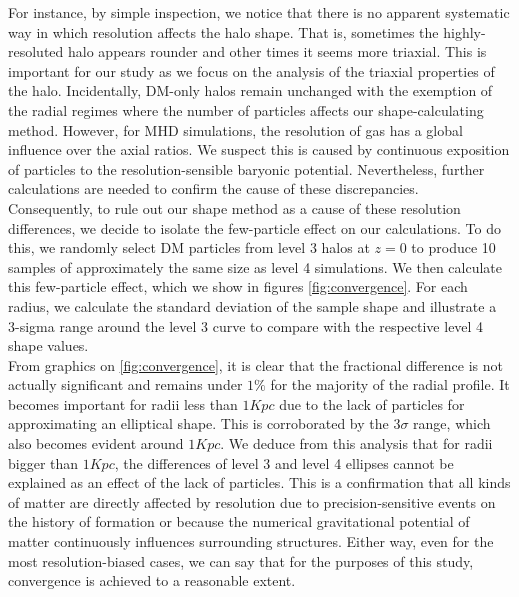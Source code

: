 For instance, by simple inspection, we notice that there is no apparent systematic way in which resolution affects the halo shape. That is, sometimes the highly-resoluted halo appears rounder and other times it seems more triaxial. This is important for our study as we focus on the analysis of the triaxial properties of the halo. Incidentally, DM-only halos remain unchanged with the exemption of the radial regimes where the number of particles affects our shape-calculating method. However, for MHD simulations, the resolution of gas has a global influence over the axial ratios. We suspect this is caused by continuous exposition of particles to the resolution-sensible baryonic potential. Nevertheless, further calculations are needed to confirm the cause of these discrepancies.\\

Consequently, to rule out our shape method as a cause of these resolution differences, we decide to isolate the few-particle effect on our calculations. To do this, we randomly select DM particles from level 3 halos at $z=0$ to produce 10 samples of approximately the same size as level 4 simulations. We then calculate this few-particle effect, which we show in figures \ref{fig:convergence}. For each radius, we calculate the standard deviation of the sample shape and illustrate a 3-sigma range around the level 3 curve to compare with the respective level 4 shape values.\\  

From graphics on \ref{fig:convergence}, it is clear that the fractional difference is not actually significant and remains under $1\%$ for the majority of the radial profile. It becomes important for radii less than $1Kpc$ due to the lack of particles for approximating an elliptical shape. This is corroborated by the $3\sigma$ range, which also becomes evident around $1Kpc$. We deduce from this analysis that for radii bigger than $1Kpc$, the differences of level 3 and level 4 ellipses cannot be explained as an effect of the lack of particles. This is a confirmation that all kinds of matter are directly affected by resolution due to precision-sensitive events on the history of formation or because the numerical gravitational potential of matter continuously influences surrounding structures. Either way, even for the most resolution-biased cases, we can say that for the purposes of this study, convergence is achieved to a reasonable extent.\\  


